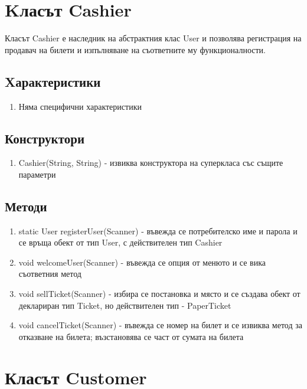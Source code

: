\documentclass[12pt]{article}
\begin{document}
\section{Kласът Cashier}

    Класът Cashier е наследник на абстрактния клас User и позволява регистрация на продавач на билети и изпълняване на съответните му функционалности.

    \subsection{Xарактеристики}

        \begin{enumerate}
            \item Няма специфични характеристики
        \end{enumerate}

    \subsection{Конструктори}

        \begin{enumerate}
            \item Cashier(String, String) - извиква конструктора на суперкласа със същите параметри
        \end{enumerate}

    \subsection{Методи}

        \begin{enumerate}
            \item static User registerUser(Scanner) - въвежда се потребителско име и парола и се връща обект от тип User, с действителен тип Cashier
            \item void welcomeUser(Scanner) - въвежда се опция от менюто и се вика съответния метод
            \item  void sellTicket(Scanner) - избира се постановка и място и се създава обект от деклариран тип Ticket, но действителен тип - PaperTicket
            \item  void cancelTicket(Scanner) - въвежда се номер на билет и се извиква метод за отказване на билета; възстановява се част от сумата на билета
        \end{enumerate}

\section{Класът Customer}
\end{document}
